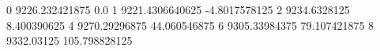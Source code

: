 0 9226.232421875 0.0
1 9221.4306640625 -4.8017578125
2 9234.6328125 8.400390625
4 9270.29296875 44.060546875
6 9305.33984375 79.107421875
8 9332.03125 105.798828125
